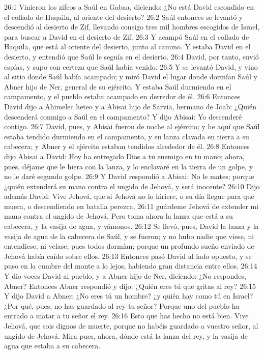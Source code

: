 26:1 Vinieron los zifeos a Saúl en Gabaa, diciendo: ¿No está David escondido en el collado de Haquila, al oriente del desierto? 
26:2 Saúl entonces se levantó y descendió al desierto de Zif, llevando consigo tres mil hombres escogidos de Israel, para buscar a David en el desierto de Zif.  
26:3 Y acampó Saúl en el collado de Haquila, que está al oriente del desierto, junto al camino. Y estaba David en el desierto, y entendió que Saúl le seguía en el desierto.  
26:4 David, por tanto, envió espías, y supo con certeza que Saúl había venido.  
26:5 Y se levantó David, y vino al sitio donde Saúl había acampado; y miró David el lugar donde dormían Saúl y Abner hijo de Ner, general de su ejército. Y estaba Saúl durmiendo en el campamento, y el pueblo estaba acampado en derredor de él.  
26:6 Entonces David dijo a Ahimelec heteo y a Abisai hijo de Sarvia, hermano de Joab: ¿Quién descenderá conmigo a Saúl en el campamento? Y dijo Abisai: Yo descenderé contigo.  
26:7 David, pues, y Abisai fueron de noche al ejército; y he aquí que Saúl estaba tendido durmiendo en el campamento, y su lanza clavada en tierra a su cabecera; y Abner y el ejército estaban tendidos alrededor de él.  
26:8 Entonces dijo Abisai a David: Hoy ha entregado Dios a tu enemigo en tu mano; ahora, pues, déjame que le hiera con la lanza, y lo enclavaré en la tierra de un golpe, y no le daré segundo golpe.  
26:9 Y David respondió a Abisai: No le mates; porque ¿quién extenderá su mano contra el ungido de Jehová, y será inocente?  
26:10 Dijo además David: Vive Jehová, que si Jehová no lo hiriere, o su día llegue para que muera, o descendiendo en batalla perezca,  
26:11 guárdeme Jehová de extender mi mano contra el ungido de Jehová. Pero toma ahora la lanza que está a su cabecera, y la vasija de agua, y vámonos.  
26:12 Se llevó, pues, David la lanza y la vasija de agua de la cabecera de Saúl, y se fueron; y no hubo nadie que viese, ni entendiese, ni velase, pues todos dormían; porque un profundo sueño enviado de Jehová había caído sobre ellos.  
26:13 Entonces pasó David al lado opuesto, y se puso en la cumbre del monte a lo lejos, habiendo gran distancia entre ellos.  
26:14 Y dio voces David al pueblo, y a Abner hijo de Ner, diciendo: ¿No respondes, Abner? Entonces Abner respondió y dijo: ¿Quién eres tú que gritas al rey?  
26:15 Y dijo David a Abner: ¿No eres tú un hombre? ¿y quién hay como tú en Israel? ¿Por qué, pues, no has guardado al rey tu señor? Porque uno del pueblo ha entrado a matar a tu señor el rey.  
26:16 Esto que has hecho no está bien. Vive Jehová, que sois dignos de muerte, porque no habéis guardado a vuestro señor, al ungido de Jehová. Mira pues, ahora, dónde está la lanza del rey, y la vasija de agua que estaba a su cabecera.  
